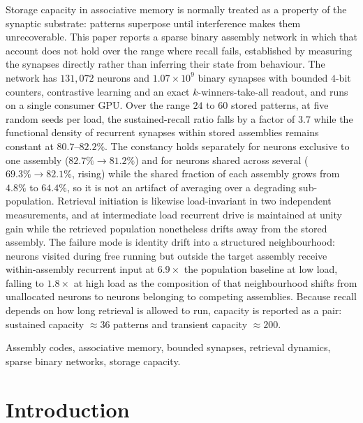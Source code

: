 \documentclass[10pt,twocolumn,a4paper]{article}
\newcommand{\pct}{\%}
\newcommand{\leadin}[1]{\noindent{\sffamily\bfseries\color{accent}\footnotesize
  \MakeUppercase{#1}}\hspace{0.8em}}
\begin{document}
\leadin{Abstract}
Storage capacity in associative memory is normally treated as a property of the
synaptic substrate: patterns superpose until interference makes them unrecoverable. This
paper reports a sparse binary assembly network in which that account does not hold over
the range where recall fails, established by measuring the synapses directly rather than
inferring their state from behaviour. The network has $131{,}072$ neurons and
$1.07\times10^{9}$ binary synapses with bounded $4$-bit counters, contrastive learning
and an exact $k$-winners-take-all readout, and runs on a single consumer GPU. Over the
range $24$ to $60$ stored patterns, at five random seeds per load, the sustained-recall
ratio falls by a factor of $3.7$ while the functional density of recurrent synapses
within stored assemblies remains constant at $80.7$--$82.2\pct$. The constancy holds
separately for neurons exclusive to one assembly ($82.7\pct \to 81.2\pct$) and for
neurons shared across several ($69.3\pct \to 82.1\pct$, rising) while the shared fraction
of each assembly grows from $4.8\pct$ to $64.4\pct$, so it is not an artifact of
averaging over a degrading sub-population. Retrieval initiation is likewise
load-invariant in two independent measurements, and at intermediate load recurrent drive
is maintained at unity gain while the retrieved population nonetheless drifts away from
the stored assembly. The failure mode is identity drift into a structured neighbourhood:
neurons visited during free running but outside the target assembly receive
within-assembly recurrent input at $6.9\times$ the population baseline at low load,
falling to $1.8\times$ at high load as the composition of that neighbourhood shifts from
unallocated neurons to neurons belonging to competing assemblies. Because recall depends
on how long retrieval is allowed to run, capacity is reported as a pair: sustained
capacity $\approx 36$ patterns and transient capacity $\approx 200$.

\vspace{3mm}
\leadin{Index Terms}
Assembly codes, associative memory, bounded synapses, retrieval dynamics, sparse binary
networks, storage capacity.

\vspace{4mm}

\section{Introduction}
\end{document}
